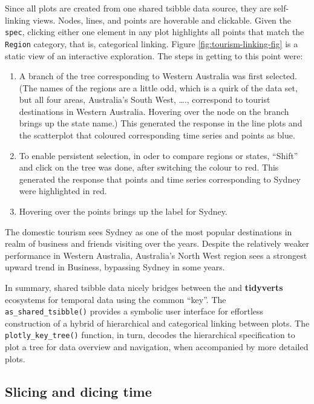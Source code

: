 Since all plots are created from one shared tsibble data source, they
are self-linking views. Nodes, lines, and points are hoverable and
clickable. Given the \texttt{spec}, clicking either one element in any
plot highlights all points that match the \texttt{Region} category, that
is, categorical linking. Figure \ref{fig:tourism-linking-fig} is a
static view of an interactive exploration. The steps in getting to this
point were:

\begin{enumerate}
\def\labelenumi{\arabic{enumi}.}
\tightlist
\item
  A branch of the tree corresponding to Western Australia was first
  selected. (The names of the regions are a little odd, which is a quirk
  of the data set, but all four areas, Australia's South West, \ldots.,
  correspond to tourist destinations in Western Australia. Hovering over
  the node on the branch brings up the state name.) This generated the
  response in the line plots and the scatterplot that coloured
  corresponding time series and points as blue.
\item
  To enable persistent selection, in oder to compare regions or states,
  ``Shift'' and click on the tree was done, after switching the colour
  to red. This generated the response that points and time series
  corresponding to Sydney were highlighted in red.
\item
  Hovering over the points brings up the label for Sydney.
\end{enumerate}

The domestic tourism sees Sydney as one of the most popular destinations
in realm of business and friends visiting over the years. Despite the
relatively weaker performance in Western Australia, Australia's North
West region sees a strongest upward trend in Business, bypassing Sydney
in some years.

In summary, shared tsibble data nicely bridges between the
 and \textbf{tidyverts} ecosystems for temporal data
using the common ``key''. The \texttt{as\_shared\_tsibble()} provides a
symbolic user interface for effortless construction of a hybrid of
hierarchical and categorical linking between plots. The
\texttt{plotly\_key\_tree()} function, in turn, decodes the hierarchical
specification to plot a tree for data overview and navigation, when
accompanied by more detailed plots.

\hypertarget{slicing-and-dicing-time}{%
\subsection{Slicing and dicing time}\label{slicing-and-dicing-time}}

